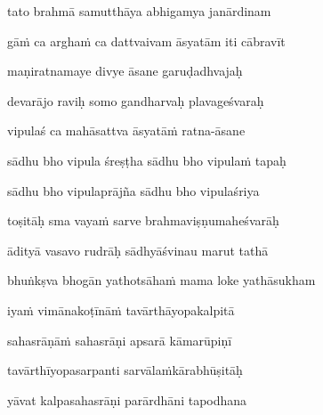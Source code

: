 tato brahmā samutthāya abhigamya janārdinam\thinspace{\dandab} \dontdisplaylinenum

gāṁ ca arghaṁ ca dattvaivam āsyatām iti cābravīt \veg\dontdisplaylinenum
{}

maṇiratnamaye divye āsane garuḍadhvajaḥ\thinspace{\dandab} \dontdisplaylinenum

devarājo raviḥ somo gandharvaḥ plavageśvaraḥ \veg\dontdisplaylinenum
{}

vipulaś ca mahāsattva āsyatāṁ ratna-āsane\thinspace{\dandab} \dontdisplaylinenum

sādhu bho vipula śreṣṭha sādhu bho vipulaṁ tapaḥ \veg\dontdisplaylinenum
{}

sādhu bho vipulaprājña sādhu bho vipulaśriya\thinspace{\dandab} \dontdisplaylinenum

toṣitāḥ sma vayaṁ sarve brahmaviṣṇumaheśvarāḥ \veg\dontdisplaylinenum
{}

ādityā vasavo rudrāḥ sādhyāśvinau marut tathā\thinspace{\dandab} \dontdisplaylinenum

bhuṅkṣva bhogān yathotsāhaṁ mama loke yathāsukham \veg\dontdisplaylinenum
{}

iyaṁ vimānakoṭīnāṁ tavārthāyopakalpitā\thinspace{\dandab} \dontdisplaylinenum

sahasrāṇāṁ sahasrāṇi apsarā kāmarūpiṇī \veg\dontdisplaylinenum
{}

tavārthīyopasarpanti sarvālaṁkārabhūṣitāḥ\thinspace{\dandab} \dontdisplaylinenum

yāvat kalpasahasrāṇi parārdhāni tapodhana \danda\dontdisplaylinenum

